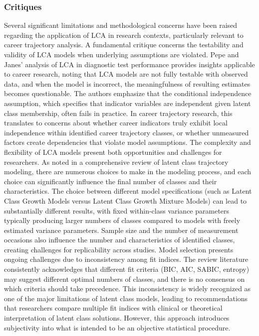 \documentclass[main.tex]{subfiles}
\begin{document}
\subsubsection{Critiques}
Several significant limitations and methodological concerns have been raised regarding the application of LCA in research contexts, particularly relevant to career trajectory analysis.
A fundamental critique concerns the testability and validity of LCA models when underlying assumptions are violated. Pepe and Janes' analysis of LCA in diagnostic test performance provides insights applicable to career research, noting that LCA models are not fully testable with observed data, and when the model is incorrect, the meaningfulness of resulting estimates becomes questionable\parencite{pepe2007}. The authors emphasize that the conditional independence assumption, which specifies that indicator variables are independent given latent class membership, often fails in practice. In career trajectory research, this translates to concerns about whether career indicators truly exhibit local independence within identified career trajectory classes, or whether unmeasured factors create dependencies that violate model assumptions.
The complexity and flexibility of LCA models present both opportunities and challenges for researchers. As noted in a comprehensive review of latent class trajectory modeling, there are numerous choices to make in the modeling process, and each choice can significantly influence the final number of classes and their characteristics\parencite{review2012}. The choice between different model specifications (such as Latent Class Growth Models versus Latent Class Growth Mixture Models) can lead to substantially different results, with fixed within-class variance parameters typically producing larger numbers of classes compared to models with freely estimated variance parameters. Sample size and the number of measurement occasions also influence the number and characteristics of identified classes, creating challenges for replicability across studies\parencite{trajectory2022}.
Model selection presents ongoing challenges due to inconsistency among fit indices. The review literature consistently acknowledges that different fit criteria (BIC, AIC, SABIC, entropy) may suggest different optimal numbers of classes, and there is no consensus on which criteria should take precedence\parencite{review2012}. This inconsistency is widely recognized as one of the major limitations of latent class models, leading to recommendations that researchers compare multiple fit indices with clinical or theoretical interpretation of latent class solutions. However, this approach introduces subjectivity into what is intended to be an objective statistical procedure.
\end{document}
